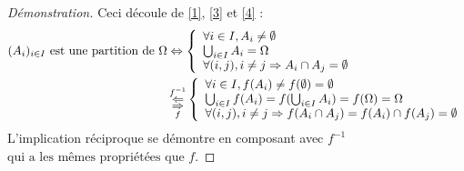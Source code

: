 \begin{proof}[Démonstration]\label{demo2}
  Ceci découle de \ref{1}, \ref{3} et \ref{4} :
  \begin{align*}
    (A_i)_{i \in I} \text{ est une partition de } \Omega  &\Leftrightarrow  \left\{
                                                                                \begin{array}{ll}
                                                                                    \forall i \in I, A_i \neq \emptyset \\
                                                                                    \bigcup_{i \in I} A_i = \Omega \\
                                                                                    \forall (i,j), i\neq j \Rightarrow A_i \cap A_j = \emptyset
                                                                                \end{array}
                                                                            \right. \\
  &\Overset{\underset{f}{\Rightarrow}}{\overset{f^{-1}}{\Leftarrow}}  \left\{
                         \begin{array}{ll}
                             \forall i \in I, f(A_i) \neq f(\emptyset) = \emptyset \\
                             \bigcup_{i \in I} f(A_i)=f(\bigcup_{i \in I} A_i) = f(\Omega) = \Omega  \\
                             \forall (i,j), i\neq j \Rightarrow f(A_i \cap A_j)= f(A_i) \cap f(A_j) = \emptyset
                         \end{array}
                     \right.
  \end{align*}
\noindent
L'implication réciproque se démontre en composant avec $f^{-1}$ $\text{qui a les mêmes propriétées que $f$}$.
\end{proof}
